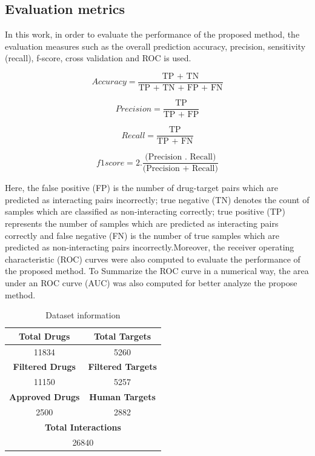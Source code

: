 \documentclass[conference]{IEEEtran}
\begin{document}
\subsection{Evaluation metrics}
In this work, in order to evaluate the performance of the proposed method, the evaluation measures such as the overall prediction accuracy, precision, sensitivity (recall), f-score, cross validation and ROC is used.

\begin{equation}
\label{eq4}
Accuracy = \frac{\text{TP + TN}}{\text{TP + TN + FP + FN} }
\end{equation}

\begin{equation}
\label{eq5}
Precision = \frac{\text{TP}}{\text{TP + FP} }
\end{equation}

\begin{equation}
\label{eq6}
Recall = \frac{\text{TP}}{\text{TP + FN} }
\end{equation}

\begin{equation}
\label{eq7}
f1 score = 2. \frac{\text{(Precision . Recall)}}{\text{(Precision + Recall)} }
\end{equation}

Here, the false positive (FP) is the number of drug-target pairs which are predicted as interacting pairs incorrectly; true negative (TN) denotes the count of samples which are classified as non-interacting correctly; true positive (TP) represents the number of samples which are predicted as interacting pairs correctly and false negative (FN) is the number of true samples which are predicted as non-interacting pairs incorrectly.Moreover, the receiver operating characteristic (ROC) curves were also computed to evaluate the performance of the proposed method. To Summarize the ROC curve in a numerical way, the area under an ROC curve (AUC) was also computed for better analyze the propose method.

\begin{table}[htbp]
\caption{Dataset information}
\begin{center}
\begin{tabular}{|c|c|}
\hline
\textbf{Total Drugs}&\textbf{Total Targets} \\
\hline
11834 & 5260 \\
\hline
\textbf{Filtered Drugs}&\textbf{Filtered Targets} \\
\hline
11150 & 5257 \\
\hline
\textbf{Approved Drugs}&\textbf{Human Targets} \\
\hline
2500 & 2882 \\
\hline
\multicolumn{2}{|c|}{\textbf{Total Interactions}} \\
\hline
\multicolumn{2}{|c|}{26840}\\
\hline
\end{tabular}
\label{tab1}
\end{center}
\end{table}
\end{document}
